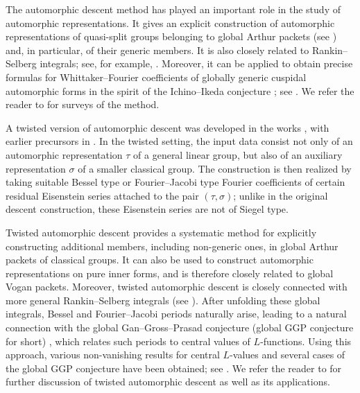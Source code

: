 \documentclass[12pt]{amsart}
\theoremstyle{remark}
\begin{document}
The automorphic descent method has played an important role in the study of automorphic representations.
It gives an explicit construction of automorphic representations of quasi-split groups belonging to global Arthur packets (see \cite{Arthur2013, Mok2015, KalethaMinguezShinWhite}) and, in particular, of their generic members. It is also closely related to Rankin--Selberg integrals; see, for example, \cite{GinzburgRallisSoudry1998, GinzburgRallisSoudry2011, AsgariCogdellShahidi2024}.
Moreover, it can be applied to obtain precise formulas for Whittaker--Fourier coefficients of globally generic cuspidal automorphic forms in the spirit of the Ichino--Ikeda conjecture \cite{IchinoIkeda2010}; see \cite{LapidMao2017}.
We refer the reader to \cite{Soudry2005, Soudry2006ICM} for surveys of the method.


A twisted version of automorphic descent was developed in the works \cite{JiangLiuXuZhang2016, JiangZhang2017, JiangLiuXu2020, JiangZhang2020Annals, LiuXu2023}, with earlier precursors in  \cite{GinzburgJiangRallis2004, GinzburgJiangRallis2005, GinzburgJiangRallis2009}.
In the twisted setting, the input data consist not only of an automorphic representation $\tau$ of a general linear group, but also of an auxiliary representation $\sigma$ of a smaller classical group.
The construction is then realized by taking suitable Bessel type or Fourier--Jacobi type Fourier coefficients of certain residual Eisenstein series attached to the pair $(\tau,\sigma)$; unlike in the original descent construction, these Eisenstein series are not of Siegel type.

Twisted automorphic descent provides a systematic method for explicitly constructing additional members, including non-generic ones, in global Arthur packets of classical groups.
It can also be used to construct automorphic representations on pure inner forms, and is therefore closely related to global Vogan packets.
Moreover, twisted automorphic descent is closely connected with more general Rankin--Selberg integrals (see \cite{JiangZhang2014, JiangZhang2020Annals}).
After unfolding these global integrals, Bessel and Fourier--Jacobi periods naturally arise, leading to a natural connection with the global Gan--Gross--Prasad conjecture (global GGP conjecture for short)  \cite{GanGrossPrasad2012}, which relates such periods to central values of $L$-functions.
Using this approach, various non-vanishing results for central $L$-values and several cases of the global GGP conjecture have been obtained; see \cite{GinzburgJiangRallis2004, GinzburgJiangRallis2005, GinzburgJiangRallis2009, JiangZhang2020Annals, JiangZhang2020JEMS, Yan2025GGP}. 
We refer the reader to \cite{JiangZhang2017, JiangZhang2021BesselDescent} for further discussion of twisted automorphic descent as well as its applications.
\end{document}
